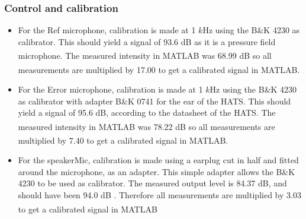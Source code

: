  
\subsubsection{Control and calibration} \label{sec:calAngInc}

\begin{itemize}
	\item For the Ref microphone, calibration is made at 1 $k$Hz using the B\&K 4230 as calibrator. This should yield a signal of 93.6 dB as it is a pressure field microphone. The measured intensity in MATLAB\textsuperscript{\textregistered} was 68.99 dB so all measurements are multiplied by 17.00 to get a calibrated signal in MATLAB\textsuperscript{\textregistered}. 
	\item For the Error microphone, calibration is made at 1 $k$Hz using the B\&K 4230 as calibrator with adapter B\&K 0741 for the ear of the HATS. This should yield a signal of 95.6 dB, according to the datasheet of the HATS. The measured intensity in MATLAB\textsuperscript{\textregistered} was 78.22 dB so all measurements are multiplied by 7.40 to get a calibrated signal in MATLAB\textsuperscript{\textregistered}. 
	\item For the speakerMic, calibration is made using a earplug cut in half and fitted around the microphone, as an adapter. This simple adapter allows the B\&K 4230 to be used as calibrator. The measured output level is 84.37 dB, and should have been 94.0 dB . Therefore all measurements are multiplied by 3.03 to get a calibrated signal in MATLAB\textsuperscript{\textregistered}
\end{itemize} 
 
